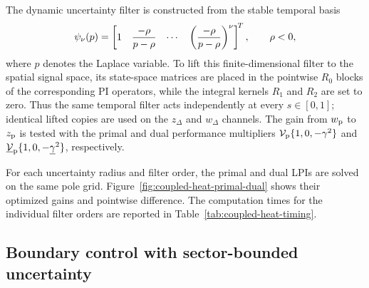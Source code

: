 The dynamic uncertainty filter is constructed from the stable temporal basis
\begin{equation*}
 \psi_\nu(p)=\begin{bmatrix}1&\dfrac{-\rho}{p-\rho}&\cdots&
 \left(\dfrac{-\rho}{p-\rho}\right)^\nu\end{bmatrix}^{\!T},
 \qquad \rho<0,
\end{equation*}
where $p$ denotes the Laplace variable. To lift this finite-dimensional
filter to the spatial signal space, its state-space matrices are placed in
the pointwise $R_0$ blocks of the corresponding PI operators, while the
integral kernels $R_1$ and $R_2$ are set to zero. Thus the same temporal
filter acts independently at every $s\in[0,1]$; identical lifted copies are
used on the $z_\Delta$ and $w_\Delta$ channels. The gain from $w_{{\mathrm{p}}}$
to $z_{{\mathrm{p}}}$ is tested with the primal and dual performance multipliers
$\mathcal{V}_{{\mathrm{p}}}\{1,0,-\gamma^2\}$ and
$\underline{\mathcal{V}}_{{\mathrm{p}}}\{1,0,-\underline\gamma^2\}$, respectively.

For each uncertainty radius and filter order, the primal and dual LPIs are
solved on the same pole grid. Figure~\ref{fig:coupled-heat-primal-dual}
shows their optimized gains and pointwise difference. The computation times
for the individual filter orders are reported in
Table~\ref{tab:coupled-heat-timing}.


\subsection{Boundary control with sector-bounded uncertainty}
\label{ex:sector-pdes}

